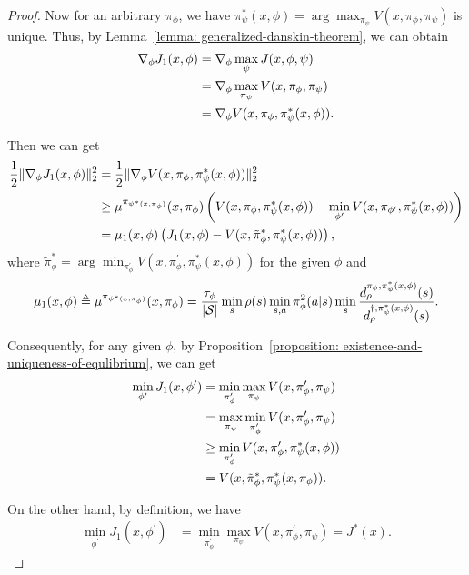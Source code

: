 \documentclass{article}
\theoremstyle{plain}
\theoremstyle{definition}
\theoremstyle{remark}
\def\cS{\mathcal S}
\def\bydef{\triangleq}
\begin{document}
\begin{proof}
    Now for an arbitrary $\pi_\phi$, we have $\pi_\psi^*(x,\phi) = \arg\max_{\pi_\psi} V(x,\pi_\phi,\pi_\psi)$ is unique. Thus, by Lemma~\ref{lemma: generalized-danskin-theorem}, we can obtain
    \begin{align}
        \nabla_{\phi} J_1(x,\phi) & = \nabla_\phi \max_{\psi} J(x,\phi,\psi)\notag \\
        & = \nabla_\phi \max_{\pi_\psi} V(x,\pi_\phi,\pi_\psi) \notag \\ 
        & = \nabla_\phi V(x,\pi_\phi,\pi_\psi^*(x,\phi))  .
    \end{align}
    
    Then we can get
    \begin{align}
        \frac{1}{2} \|  \nabla_{\phi} J_1(x,\phi) \|_2^2 & = \frac{1}{2} \|\nabla_\phi V(x,\pi_\phi,\pi^*_{\psi}(x,\phi)) \|_2^2 \notag \\
        & \geq \mu^{\pi_{\psi^*(x,\pi_\phi)}}(x,\pi_\phi) \left( V(x,\pi_\phi,\pi^*_{\psi}(x,\phi)) -  \min_{\phi^\prime} V(x,\pi_{\phi^\prime},\pi^*_{\psi}(x,\phi)) \right) \notag \\
        & =  \mu_1(x,\phi) \left( J_1(x,\phi) -  V(x,\tilde{\pi}_\phi^*,\pi^*_{\psi}(x,\phi)) \right),
    \end{align}
    where $\tilde{\pi}_\phi^* = \arg\min_{\pi_\phi^\prime}   V(x,\pi_\phi^\prime,\pi^*_{\psi}(x,\phi))$ for the given $\phi$ and
    \begin{align}
        \mu_1(x,\phi) \bydef \mu^{\pi_{\psi^*(x,\pi_\phi)}}(x,\pi_\phi) = \frac{\tau_\phi}{|\cS|}  \min_s \rho(s) \min_{s,a} \pi_\phi^2(a|s) \min_s \frac{d^{\pi_\phi,\pi^*_{\psi}(x,\phi)}_\rho (s) }{d^{\dag,\pi^*_{\psi}(x,\phi)}_\rho(s)} \notag.
    \end{align}

    Consequently, for any given $\phi$, by Proposition~\ref{proposition: existence-and-uniqueness-of-equlibrium}, we can get
    \begin{align}
        \min_{\phi^\prime} J_1(x,\phi^\prime) & = \min_{\pi_\phi^\prime} \max_{\pi_\psi} V(x,\pi_\phi^\prime,\pi_\psi) \notag \\
        & = \max_{\pi_\psi} \min_{\pi_\phi^\prime} V(x,\pi_\phi^\prime,\pi_\psi) \notag \\
        & \geq \min_{\pi_\phi^\prime} V(x,\pi_\phi^\prime,\pi_\psi^*(x,\phi)) \notag \\
        & = V(x,\tilde{\pi}_\phi^*,\pi_\psi^*(x,\pi_\phi)).
    \end{align}
    
    On the other hand, by definition, we have
    \begin{align}
        \min_{\phi^\prime} J_1(x,\phi^\prime) & = \min_{\pi_\phi^\prime} \max_{\pi_\psi} V(x,\pi_\phi^\prime,\pi_\psi) = J^*(x).
    \end{align}


\end{proof}
\end{document}
